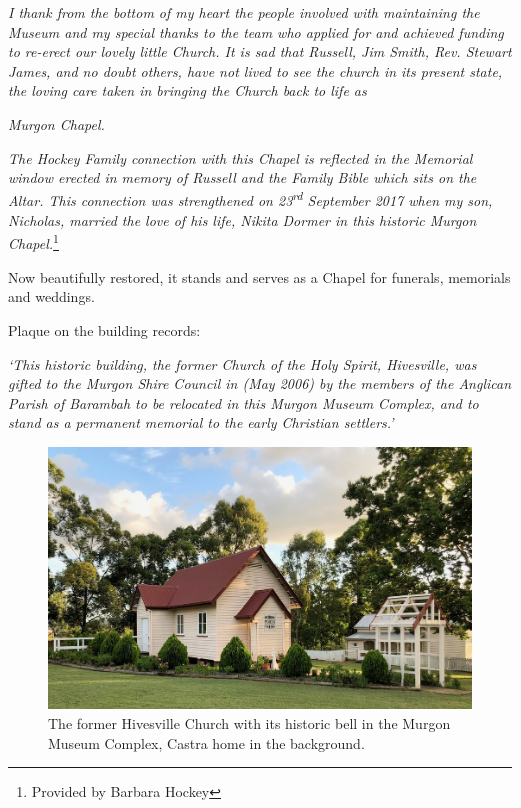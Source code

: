 \emph{I thank from the bottom of my heart the people involved with maintaining the Museum and my special thanks to the team who applied for and achieved funding to re-erect our lovely little Church. It is sad that Russell, Jim Smith, Rev. Stewart James, and no doubt others, have not lived to see the church in its present state, the loving care taken in bringing the Church back to life as}



\emph{Murgon Chapel.}



\emph{The Hockey Family connection with this Chapel is reflected in the Memorial window erected in memory of Russell and the Family Bible which sits on the Altar. This connection was strengthened on 23\textsuperscript{rd} September 2017 when my son, Nicholas, married the love of his life, Nikita Dormer in this historic Murgon Chapel.}\footnote{Provided by Barbara Hockey}


\medskip


Now beautifully restored, it stands and serves as a Chapel for funerals, memorials and weddings.



Plaque on the building records:



\emph{`This historic building, the former Church of the Holy Spirit, Hivesville, was gifted to the Murgon Shire Council in (May 2006) by the members of the Anglican Parish of Barambah to be relocated in this Murgon Museum Complex, and to stand as a permanent memorial to the early Christian settlers.'}









\begin{figure}[!htb]
\begin{center}
\includegraphics[width=1.\textwidth,center]{../images/hivesvilleChurchToday.jpg}
\caption{The former Hivesville Church with its historic bell in the Murgon Museum Complex, Castra home in the background.}
\end{center}
\end{figure}




